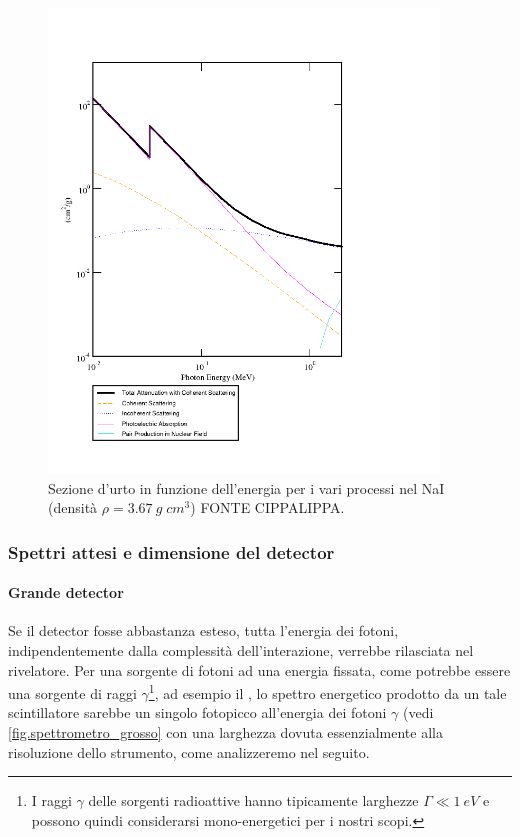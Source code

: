   \begin{figure}[h]
 	\centering
 	\includegraphics[width=28em]{photon_cross_section_xcom}
 	\caption{\label{fig:photon_cross_section_xcom}Sezione d'urto in funzione dell'energia per i vari processi nel NaI (densità $\rho = \SI{3.67}{g\;cm^3}$) FONTE CIPPALIPPA.}
 \end{figure}
 
 \subsubsection{Spettri attesi e dimensione del detector}
 \paragraph{Grande detector} Se il detector fosse abbastanza esteso, tutta l'energia dei fotoni, indipendentemente dalla complessità dell'interazione, verrebbe rilasciata nel rivelatore. Per una sorgente di fotoni ad una energia fissata, come potrebbe essere una sorgente di raggi $\gamma$\footnote{I raggi $\gamma$ delle sorgenti radioattive hanno tipicamente larghezze $\Gamma \ll \SI{1}{eV}$ e possono quindi considerarsi mono-energetici per i nostri scopi.},
 ad esempio il \cs, lo spettro energetico prodotto da un tale scintillatore sarebbe un singolo fotopicco all'energia dei fotoni $\gamma$ (vedi \autoref{fig.spettrometro_grosso} con una larghezza dovuta essenzialmente alla risoluzione dello strumento, come analizzeremo nel seguito.
 

